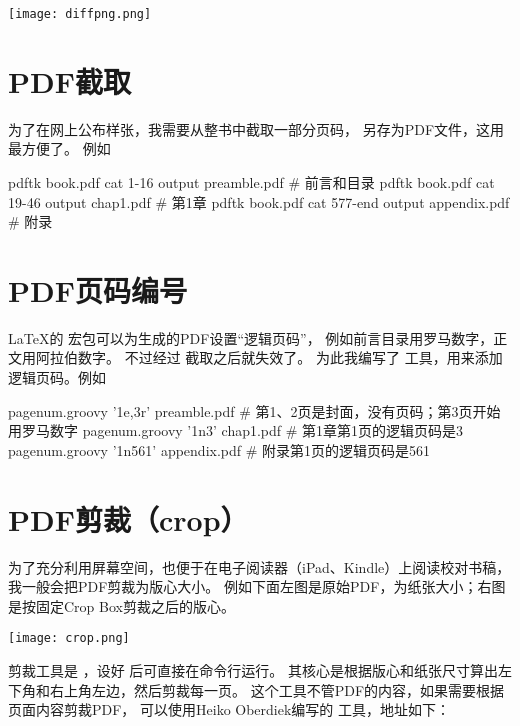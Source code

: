 \vspace{1ex}
\centerline{\texttt{[image: diffpng.png]}}

\section{PDF截取}
为了在网上公布样张，我需要从整书中截取一部分页码，
另存为PDF文件，这用  最方便了。
例如

\begin{Code}
pdftk book.pdf cat 1-16 output preamble.pdf     # 前言和目录
pdftk book.pdf cat 19-46 output chap1.pdf       # 第1章
pdftk book.pdf cat 577-end output appendix.pdf  # 附录
\end{Code}


\section{PDF页码编号}

\LaTeX 的  宏包可以为生成的PDF设置“逻辑页码”，
例如前言目录用罗马数字，正文用阿拉伯数字。
不过经过  截取之后就失效了。
为此我编写了  工具，用来添加逻辑页码。例如

\begin{Code}
pagenum.groovy '1e,3r' preamble.pdf  # 第1、2页是封面，没有页码；第3页开始用罗马数字
pagenum.groovy '1n3'   chap1.pdf     # 第1章第1页的逻辑页码是3
pagenum.groovy '1n561' appendix.pdf  # 附录第1页的逻辑页码是561
\end{Code}


\section{PDF剪裁（crop）}
为了充分利用屏幕空间，也便于在电子阅读器（iPad、Kindle）上阅读校对书稿，
我一般会把PDF剪裁为版心大小。
例如下面左图是原始PDF，为纸张大小；右图是按固定Crop Box剪裁之后的版心。

\vspace{1ex}
\centerline{\texttt{[image: crop.png]}}

剪裁工具是 ，设好  后可直接在命令行运行。
其核心是根据版心和纸张尺寸算出左下角和右上角左边，然后剪裁每一页。
这个工具不管PDF的内容，如果需要根据页面内容剪裁PDF，
可以使用Heiko Oberdiek编写的  工具，地址如下：

